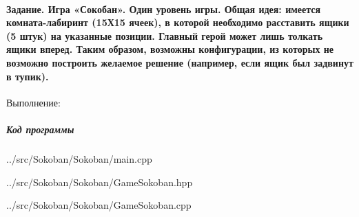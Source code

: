 \paragraph{
    Задание.
    Игра «Сокобан». Один уровень игры. Общая идея: имеется комната-лабиринт (15Х15 ячеек),
    в которой необходимо расставить ящики (5 штук) на указанные позиции.
    Главный герой может лишь толкать ящики вперед.
    Таким образом, возможны конфигурации, из которых не возможно построить желаемое решение
    (например, если ящик был задвинут в тупик).
} \hspace{0pt}

Выполнение:

\subparagraph{Код программы} \hspace{0pt}


{../src/Sokoban/Sokoban/main.cpp}


{../src/Sokoban/Sokoban/GameSokoban.hpp}


{../src/Sokoban/Sokoban/GameSokoban.cpp}
